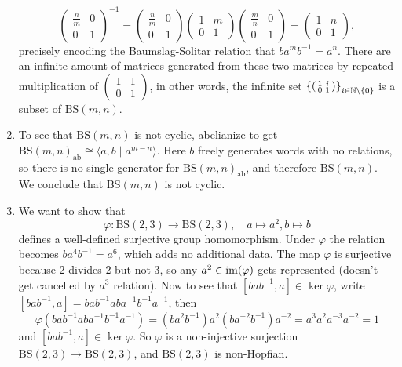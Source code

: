 \begin{ex}
\begin{enumerate}[label=(\arabic*)]
\[\begin{pmatrix}
    \frac{n}{m} & 0 \\ 0 & 1 
\end{pmatrix}^{-1}=
\begin{pmatrix}
    \frac{n}{m} & 0 \\ 0 & 1
\end{pmatrix} 
\begin{pmatrix}
    1 & m \\ 0 & 1
\end{pmatrix} 
\begin{pmatrix}
    \frac{m}{n} & 0 \\ 0 & 1 
\end{pmatrix}=
\begin{pmatrix}
    1 & n \\ 0 & 1
\end{pmatrix}, 
\] precisely encoding the Baumslag-Solitar relation that $b a^m b^{-1}=a^n $. There are an infinite amount of matrices generated from these two matrices by repeated multiplication of $\left( 
\begin{smallmatrix}
    1 & 1 \\ 0 & 1
\end{smallmatrix}\right) $, in other words, the infinite set $\left\{\left( 
\begin{smallmatrix}
    1 & i \\ 0 & 1
\end{smallmatrix}\right) \right\}_{i \in \mathbb{N} \setminus \{0\} } $ is a subset of $\mathrm{BS}(m,n)$.
\item To see that $\mathrm{BS}(m,n)$ is not cyclic, abelianize to get $\mathrm{BS}(m,n)_{\mathrm{ab}}\cong \langle a,b \mid a ^{m-n} \rangle $. Here $b$ freely generates words with no relations, so there is no single generator for $\mathrm{BS}(m,n) _{\mathrm{ab}}$, and therefore $\mathrm{BS}(m,n)$. We conclude that $\mathrm{BS}(m,n)$ is not cyclic.
\item We want to show that \[
        \varphi  \colon \mathrm{BS}(2,3) \to \mathrm{BS}(2,3),\quad a\mapsto a^2,b\mapsto b
    \] defines a well-defined surjective group homomorphism. Under $\varphi $ the relation becomes $ba^4 b^{-1}=a^6$, which adds no additional data. The map $\varphi $ is surjective because 2 divides 2 but not 3, so any $a^2 \in \operatorname{im}(\varphi )$ gets represented (doesn't get cancelled by $a^3$ relation). Now to see that $[ba b^{-1},a] \in \ker \varphi $, write $[bab^{-1},a]=bab^{-1}aba^{-1}b^{-1}a^{-1}$, then \[
    \varphi (bab^{-1}aba^{-1}b^{-1}a^{-1})=(ba^2b^{-1})a^2(ba^{-2}b^{-1})a^{-2}=a^3a^2a^{-3}a^{-2}=1
\] and $[bab^{-1},a] \in \ker \varphi $. So $\varphi $ is a non-injective surjection $\mathrm{BS}(2,3) \to \mathrm{BS}(2,3)$, and $\mathrm{BS}(2,3)$ is non-Hopfian.
    \end{enumerate}
\end{ex}
